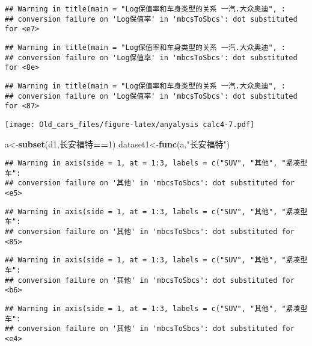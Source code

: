 \documentclass[]{article}
\newenvironment{Shaded}{\begin{snugshade}}{\end{snugshade}}
\newcommand{\KeywordTok}[1]{\textcolor[rgb]{0.13,0.29,0.53}{\textbf{#1}}}
\newcommand{\DecValTok}[1]{\textcolor[rgb]{0.00,0.00,0.81}{#1}}
\newcommand{\StringTok}[1]{\textcolor[rgb]{0.31,0.60,0.02}{#1}}
\newcommand{\OperatorTok}[1]{\textcolor[rgb]{0.81,0.36,0.00}{\textbf{#1}}}
\newcommand{\NormalTok}[1]{#1}
\begin{document}
\begin{verbatim}
## Warning in title(main = "Log保值率和车身类型的关系 一汽.大众奥迪", :
## conversion failure on 'Log保值率' in 'mbcsToSbcs': dot substituted for <e7>
\end{verbatim}

\begin{verbatim}
## Warning in title(main = "Log保值率和车身类型的关系 一汽.大众奥迪", :
## conversion failure on 'Log保值率' in 'mbcsToSbcs': dot substituted for <8e>
\end{verbatim}

\begin{verbatim}
## Warning in title(main = "Log保值率和车身类型的关系 一汽.大众奥迪", :
## conversion failure on 'Log保值率' in 'mbcsToSbcs': dot substituted for <87>
\end{verbatim}

\texttt{[image: Old\_cars\_files/figure-latex/anyalysis calc4-7.pdf]}

\begin{Shaded}
\begin{Highlighting}[]
\NormalTok{a<-}\KeywordTok{subset}\NormalTok{(d1,长安福特}\OperatorTok{==}\DecValTok{1}\NormalTok{)}
\NormalTok{dataset1<-}\KeywordTok{func}\NormalTok{(a,}\StringTok{"长安福特"}\NormalTok{)}
\end{Highlighting}
\end{Shaded}

\begin{verbatim}
## Warning in axis(side = 1, at = 1:3, labels = c("SUV", "其他", "紧凑型车":
## conversion failure on '其他' in 'mbcsToSbcs': dot substituted for <e5>
\end{verbatim}

\begin{verbatim}
## Warning in axis(side = 1, at = 1:3, labels = c("SUV", "其他", "紧凑型车":
## conversion failure on '其他' in 'mbcsToSbcs': dot substituted for <85>
\end{verbatim}

\begin{verbatim}
## Warning in axis(side = 1, at = 1:3, labels = c("SUV", "其他", "紧凑型车":
## conversion failure on '其他' in 'mbcsToSbcs': dot substituted for <b6>
\end{verbatim}

\begin{verbatim}
## Warning in axis(side = 1, at = 1:3, labels = c("SUV", "其他", "紧凑型车":
## conversion failure on '其他' in 'mbcsToSbcs': dot substituted for <e4>
\end{verbatim}
\end{document}
